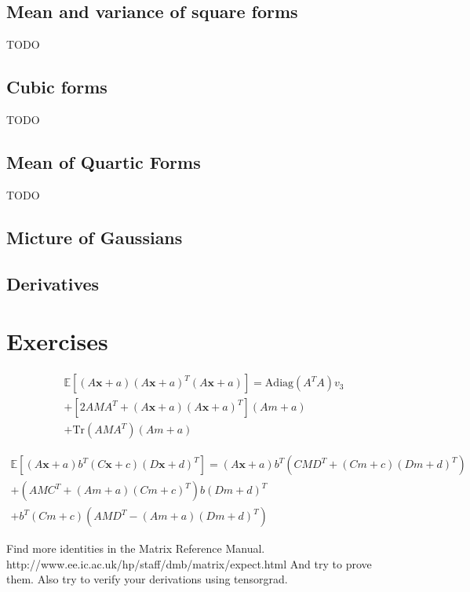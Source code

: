 \subsection{Mean and variance of square forms}
TODO
\subsection{Cubic forms}
TODO
\subsection{Mean of Quartic Forms}
TODO
\subsection{Micture of Gaussians}
\subsection{Derivatives}

\section{Exercises}
\begin{exercise}
   \begin{align*}
   \mathbb{E}[(A\mathbf{x} + a)(A\mathbf{x} + a)^T (A\mathbf{x} + a)] = 
   \text{Adiag}(A^T A) v_3 \\
   + [2 AMA^T + (A\mathbf{x} + a)(A\mathbf{x} + a)^T] (Am + a) \\
   + \text{Tr}(AMA^T)(Am + a)
   \end{align*}

   \begin{align*}
   \mathbb{E}[(A\mathbf{x} + a) b^T (C\mathbf{x} + c)(D\mathbf{x} + d)^T] = 
   (A\mathbf{x} + a) b^T (CMD^T + (Cm + c)(Dm + d)^T) \\
   + (AMC^T + (Am + a)(Cm + c)^T) b(Dm + d)^T \\
   + b^T (Cm + c)(AMD^T - (Am + a)(Dm + d)^T)
   \end{align*}
\end{exercise}
\begin{exercise}
   Find more identities in the Matrix Reference Manual.
   http://www.ee.ic.ac.uk/hp/staff/dmb/matrix/expect.html
   And try to prove them.
   Also try to verify your derivations using tensorgrad.
\end{exercise}
